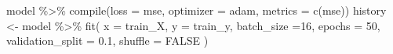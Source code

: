 \documentclass[
]{article}
\newenvironment{Shaded}{\begin{snugshade}}{\end{snugshade}}
\newcommand{\AttributeTok}[1]{\textcolor[rgb]{0.77,0.63,0.00}{#1}}
\newcommand{\ConstantTok}[1]{\textcolor[rgb]{0.00,0.00,0.00}{#1}}
\newcommand{\DecValTok}[1]{\textcolor[rgb]{0.00,0.00,0.81}{#1}}
\newcommand{\FloatTok}[1]{\textcolor[rgb]{0.00,0.00,0.81}{#1}}
\newcommand{\FunctionTok}[1]{\textcolor[rgb]{0.00,0.00,0.00}{#1}}
\newcommand{\NormalTok}[1]{#1}
\newcommand{\OtherTok}[1]{\textcolor[rgb]{0.56,0.35,0.01}{#1}}
\newcommand{\SpecialCharTok}[1]{\textcolor[rgb]{0.00,0.00,0.00}{#1}}
\newcommand{\StringTok}[1]{\textcolor[rgb]{0.31,0.60,0.02}{#1}}
\begin{document}
\begin{Shaded}
\begin{Highlighting}[]
\NormalTok{model }\SpecialCharTok{\%\textgreater{}\%} \FunctionTok{compile}\NormalTok{(}\AttributeTok{loss =} \StringTok{\textquotesingle{}mse\textquotesingle{}}\NormalTok{,}
                  \AttributeTok{optimizer =} \StringTok{\textquotesingle{}adam\textquotesingle{}}\NormalTok{,}
                  \AttributeTok{metrics =} \FunctionTok{c}\NormalTok{(}\StringTok{\textquotesingle{}mse\textquotesingle{}}\NormalTok{))}
\NormalTok{history }\OtherTok{\textless{}{-}}\NormalTok{ model }\SpecialCharTok{\%\textgreater{}\%} \FunctionTok{fit}\NormalTok{(}
  \AttributeTok{x =}\NormalTok{ train\_X,}
  \AttributeTok{y =}\NormalTok{ train\_y,}
  \AttributeTok{batch\_size =}\DecValTok{16}\NormalTok{,}
  \AttributeTok{epochs =} \DecValTok{50}\NormalTok{,}
  \AttributeTok{validation\_split =} \FloatTok{0.1}\NormalTok{,}
  \AttributeTok{shuffle =} \ConstantTok{FALSE}
\NormalTok{)}
\end{Highlighting}
\end{Shaded}
\end{document}
